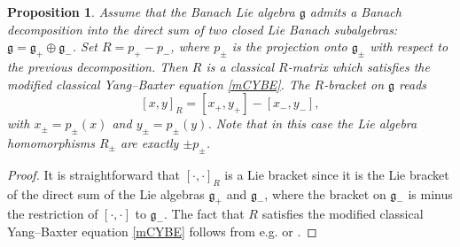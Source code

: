 \documentclass[a4paper,12pt,reqno]{amsart}%
\newtheorem{proposition}[theorem]{Proposition}
\theoremstyle{definition}
\theoremstyle{remark}
\numberwithin{theorem}{section}
\numberwithin{equation}{section}
\newcommand{\1}{{\bf 1}}
\newcommand{\g}{{\mathfrak g}}
\begin{document}
\begin{proposition}\label{example_R}
Assume that the Banach Lie algebra $\mathfrak{g}$ admits a Banach decomposition into the direct sum of two closed Lie Banach subalgebras: $\mathfrak{g} = \mathfrak{g}_+\oplus\mathfrak{g}_-$. Set $R = p_+ - p_-$, where $p_{\pm}$ is the projection onto $\mathfrak{g}_{\pm}$ with respect to the previous decomposition. 
   Then $R$ is a classical $R$-matrix which satisfies the  modified classical Yang–Baxter
equation \eqref{mCYBE}. The $R$-bracket on $\mathfrak{g}$ reads
\begin{equation}\label{R-bracket}
[x, y]_R = [x_+, y_+] - [x_-, y_-],
\end{equation}
with $x_\pm = p_{\pm}(x)$ and $y_{\pm} = p_{\pm}(y)$. Note that in this case the Lie algebra homomorphisms $R_\pm$ are exactly $\pm p_\pm$.
\end{proposition}
\begin{proof}
    It is straightforward that $[\cdot,\cdot]_R$ is a Lie bracket since it is the Lie bracket of the direct sum of the Lie algebras $\g_+$ and $\g_-$, where the bracket on $\g_-$ is minus the restriction of $[\cdot, \cdot]$ to $\g_-$. 
    The fact that $R$ satisfies the modified classical Yang--Baxter equation \eqref{mCYBE} follows from e.g. \cite[Proposition~5]{semenov83} or \cite[Lemma~4.34]{adler}.
\end{proof}
\end{document}
